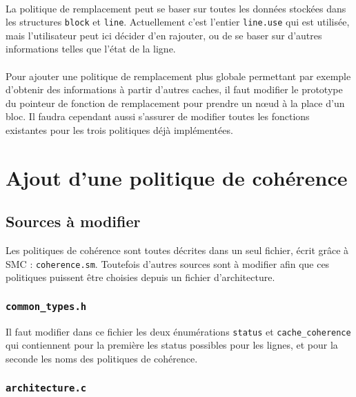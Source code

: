 \paragraph{}
La politique de remplacement peut se baser sur toutes les données stockées dans les structures \texttt{block} et \texttt{line}. Actuellement c'est l'entier \texttt{line.use} qui est utilisée, mais l'utilisateur peut ici décider d'en rajouter, ou de se baser sur d'autres informations telles que l'état de la ligne.

\paragraph{}
Pour ajouter une politique de remplacement plus globale permettant par exemple d'obtenir des informations à partir d'autres caches, il faut modifier le prototype du pointeur de fonction de remplacement pour prendre un n{\oe}ud à la place d'un bloc. Il faudra cependant aussi s'assurer de modifier toutes les fonctions existantes pour les trois politiques déjà implémentées.

\section{Ajout d'une politique de cohérence}
\label{tuto_aut}

\subsection{Sources à modifier}

Les politiques de cohérence sont toutes décrites dans un seul fichier, écrit grâce à \textsf{SMC} : \texttt{coherence.sm}. Toutefois d'autres sources sont à modifier afin que ces politiques puissent être choisies depuis un fichier d'architecture.

\subsubsection{\texttt{common\_types.h}}

Il faut modifier dans ce fichier les deux énumérations \texttt{status} et \texttt{cache\_coherence} qui contiennent pour la première les status possibles pour les lignes, et pour la seconde les noms des politiques de cohérence.

\subsubsection{\texttt{architecture.c}}

